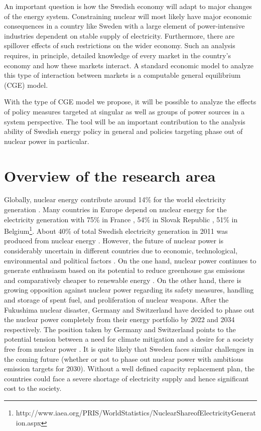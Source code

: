 An important question is how the Swedish economy will adapt to major changes of the energy system. Constraining nuclear will most likely have major economic consequences in a country like Sweden with a large element of power-intensive industries dependent on stable supply of electricity. Furthermore, there are spillover effects of such restrictions on the wider economy. Such an analysis requires, in principle, detailed knowledge of every market in the country's economy and how these markets interact. A standard economic model to analyze this type of interaction between markets is a computable general equilibrium (CGE) model.

With the type of CGE model we propose, it will be possible to analyze the effects of policy measures targeted at singular as well as groups of power sources in a system perspective. The tool will be an important contribution to the analysis ability of Swedish energy policy in general and policies targeting phase out of nuclear power in particular.

\section{Overview of the research area}
Globally, nuclear energy contribute around 14\% for the world electricity generation \citep{OECD2012}. Many countries in Europe depend on nuclear energy for the electricity generation with 75\% in France , 54\% in Slovak Republic , 51\% in Belgium\footnote{http://www.iaea.org/PRIS/WorldStatistics/NuclearShareofElectricityGeneration.aspx}. About 40\% of total Swedish electricity generation in 2011 was produced from nuclear energy \citep{SEA2012}. However, the future of nuclear power is considerably uncertain in different countries due to economic, technological, environmental and political factors \citep{Joskow2012}. On the one hand, nuclear power continues to generate enthusiasm based on its potential to reduce greenhouse gas emissions and comparatively cheaper to renewable energy \citep{Davis2012, Renssen2013}. On the other hand, there is growing opposition against nuclear power regarding its safety measures, handling and storage of spent fuel, and proliferation of nuclear weapons. After the Fukushima nuclear disaster, Germany and Switzerland have decided to phase out the nuclear power completely from their energy portfolio by  2022 and 2034 respectively. The position taken by Germany and Switzerland points to the potential tension between a need for climate mitigation and a desire for a society free from nuclear power \citep{Glomsrod2013}. It is quite likely that Sweden faces similar challenges in the coming future (whether or not to phase out nuclear power with ambitious emission targets for 2030). Without a well defined capacity replacement plan, the countries could face a severe shortage of electricity supply and hence significant cost to the society.

